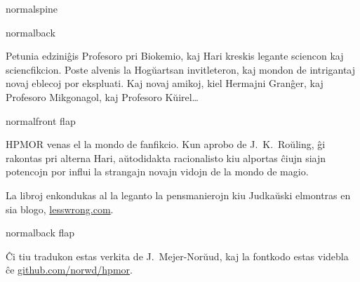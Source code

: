 \documentclass[12pt,coverwidth=\the\hpcoverwidth,coverheight=\the\hpcoverheight,spinewidth=\the\hpspinewidth,marklength=0mm,bleedwidth=5mm,flapwidth=63mm]{bookcover}
\begin{document}
\begin{bookcover}

\begin{bookcoverelement}{normal}{spine}
\centering
\color{white}\scshape
\vspace{0.5cm}\huge \volumenumber\\[2ex]\Large
\vfill
{}
\vfill
\end{bookcoverelement}

\begin{bookcoverelement}{normal}{back}
  \centering
  \vspace{20mm}
  \parbox{110mm}{\color{white}\Large\raggedright
Petunia edziniĝis Profesoro pri Biokemio, kaj Hari kreskis legante sciencon kaj sciencfikcion. Poste alvenis la Hogŭartsan invitleteron, kaj mondon de intrigantaj novaj eblecoj por ekspluati. Kaj novaj amikoj, kiel Hermajni Granĝer, kaj Profesoro Mikgonagol, kaj Profesoro Kŭirel…
}
\end{bookcoverelement}

\begin{bookcoverelement}{normal}{front flap}
\centering
\vspace{20mm}
\parbox{40mm}{\color{white}\raggedright\small
  HPMOR venas el la mondo de fanfikcio. Kun aprobo de J.~K.~Roŭling, ĝi rakontas pri alterna Hari, aŭtodidakta racionalisto kiu alportas ĉiujn siajn potencojn por influi la strangajn novajn vidojn de la mondo de magio.

  \bigskip La libroj enkondukas al la leganto la pensmanierojn kiu Judkaŭski elmontras en sia blogo, \href{https://lesswrong.com}{lesswrong.com}.}
\end{bookcoverelement}

\begin{bookcoverelement}{normal}{back flap}
\centering
\vspace{20mm}
\parbox{40mm}{\color{white}\small\raggedright
  Ĉi tiu tradukon estas verkita de J.~Mejer\nobreakdash-Norŭud, kaj la fontkodo estas videbla ĉe \href{https://github.com/norwd/hpmor}{github.com/norwd/hpmor}.
}
\end{bookcoverelement}

\end{bookcover}
\end{document}

